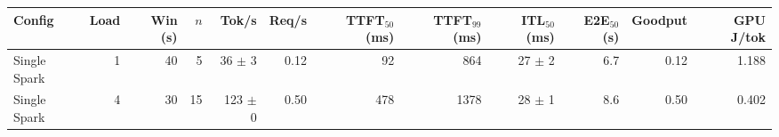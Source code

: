 \begin{tabular}{l r r r r r r r r r r r}
\toprule
Config & Load & Win (s) & $n$ & Tok/s & Req/s & TTFT$_{50}$ (ms) & TTFT$_{99}$ (ms) & ITL$_{50}$ (ms) & E2E$_{50}$ (s) & Goodput & GPU J/tok \\
\midrule
Single Spark & 1 & 40 & 5\rlap{$^\dagger$} & 36 $\pm$ 3 & 0.12 & 92 & 864 & 27 $\pm$ 2 & 6.7 & 0.12 & 1.188 \\
Single Spark & 4 & 30 & 15\rlap{$^\dagger$} & 123 $\pm$ 0 & 0.50 & 478 & 1378 & 28 $\pm$ 1 & 8.6 & 0.50 & 0.402 \\
\bottomrule
\end{tabular}
